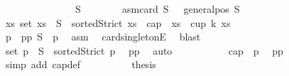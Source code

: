 \begin{isabellebody}
\ \ \isamarkupfalse%
{\isacharminus}{\kern0pt}\isanewline
\ \ \ \ \isakeywordONE{{\isacharbraceleft}{\kern0pt}}\isamarkupfalse%
\isanewline
\ \ \ \ \ \ \isamarkupfalse%
\ S\isanewline
\ \ \ \ \ \ \isamarkupfalse%
\ asm{\isacharcolon}{\kern0pt}{\isachardoublequoteopen}card\ S\ {\isacharequal}{\kern0pt}\ {}{\isachardoublequoteclose}\ {\isachardoublequoteopen}general{\isacharunderscore}{\kern0pt}pos\ S{\isachardoublequoteclose}\isanewline
\ \ \ \ \ \ \isamarkupfalse%
\ {\isachardoublequoteopen}{\isacharparenleft}{\kern0pt}{\isasymexists}xs{\isachardot}{\kern0pt}\ set\ xs\ {\isasymsubseteq}\ S\ {\isasymand}\ sortedStrict\ xs\ {\isasymand}\ {\isacharparenleft}{\kern0pt}cap\ {}\ xs\ {\isasymor}\ cup\ k\ xs{\isacharparenright}{\kern0pt}{\isacharparenright}{\kern0pt}{\isachardoublequoteclose}\isanewline
\ \ \ \ \ \ \isamarkupfalse%
{\isacharminus}{\kern0pt}\isanewline
\ \ \ \ \ \ \ \ \isamarkupfalse%
\ p\ \ p{}p{}{\isacharcolon}{\kern0pt}\ {\isachardoublequoteopen}S\ {\isacharequal}{\kern0pt}\ {\isacharbraceleft}{\kern0pt}p{\isacharbraceright}{\kern0pt}{\isachardoublequoteclose}\ \isamarkupfalse%
\ asm\ \isamarkupfalse%
\ card{\isacharunderscore}{\kern0pt}{}{\isacharunderscore}{\kern0pt}singletonE\ \isamarkupfalse%
\ blast\isanewline
\ \ \ \ \ \ \ \ \isamarkupfalse%
\ {}{\isacharcolon}{\kern0pt}{\isachardoublequoteopen}set\ {\isacharbrackleft}{\kern0pt}p{\isacharbrackright}{\kern0pt}\ {\isasymsubseteq}\ S\ {\isasymand}\ sortedStrict\ {\isacharbrackleft}{\kern0pt}p{\isacharbrackright}{\kern0pt}{\isachardoublequoteclose}\ \isamarkupfalse%
\ p{}p{}\ \isamarkupfalse%
\ auto\isanewline
\ \ \ \ \ \ \ \ \isamarkupfalse%
\ {}{\isacharcolon}{\kern0pt}\ {\isachardoublequoteopen}cap\ {}\ {\isacharbrackleft}{\kern0pt}p{\isacharbrackright}{\kern0pt}{\isachardoublequoteclose}\ \isamarkupfalse%
\ p{}p{}\ \isamarkupfalse%
\ {\isacharparenleft}{\kern0pt}simp\ add{\isacharcolon}{\kern0pt}\ cap{\isacharunderscore}{\kern0pt}def{\isacharparenright}{\kern0pt}\isanewline
\ \ \ \ \ \ \ \ \isamarkupfalse%
\ {\isacharquery}{\kern0pt}thesis\ \isamarkupfalse%
\ {}\ {}\ \isamarkupfalse%

\end{isabellebody}
